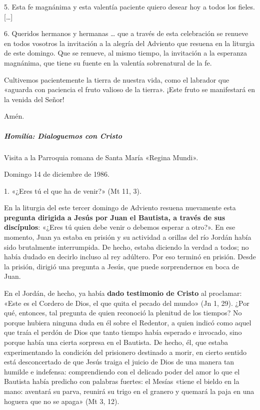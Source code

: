 \documentclass[]{article}
\let\oldsubparagraph\subparagraph
\renewcommand{\subparagraph}[1]{\oldsubparagraph{#1}\mbox{}}
\begin{document}
5. Esta fe magnánima y esta valentía paciente quiero desear hoy a todos
los fieles. {[}\ldots{}{]}

6. Queridos hermanos y hermanas \ldots{} que a través de esta
celebración se renueve en todos vosotros la invitación a la alegría del
Adviento que resuena en la liturgia de este domingo. Que se renueve, al
mismo tiempo, la invitación a la esperanza magnánima, que tiene su
fuente en la valentía sobrenatural de la fe.

Cultivemos pacientemente la tierra de nuestra vida, como el labrador que
«aguarda con paciencia el fruto valioso de la tierra». ¡Este fruto se
manifestará en la venida del Señor!

Amén.

\subparagraph{Homilía: Dialoguemos con
Cristo}\label{homiluxeda-dialoguemos-con-cristo}

Visita a la Parroquia romana de Santa María «Regina Mundi». 

Domingo 14 de diciembre de 1986.

1. «¿Eres tú el que ha de venir?» (Mt 11, 3).

En la liturgia del este tercer domingo de Adviento resuena nuevamente
esta \textbf{pregunta dirigida a Jesús por Juan el Bautista, a través de
sus discípulos}: «¿Eres tú quien debe venir o debemos esperar a otro?».
En ese momento, Juan ya estaba en prisión y su actividad a orillas del
río Jordán había sido brutalmente interrumpida. De hecho, estaba
diciendo la verdad a todos; no había dudado en decirlo incluso al rey
adúltero. Por eso terminó en prisión. Desde la prisión, dirigió una
pregunta a Jesús, que puede sorprendernos en boca de Juan.

En el Jordán, de hecho, ya había \textbf{dado testimonio de Cristo} al
proclamar: «Este es el Cordero de Dios, el que quita el pecado del
mundo» (Jn 1, 29). ¿Por qué, entonces, tal pregunta de quien reconoció
la plenitud de los tiempos? No porque hubiera ninguna duda en él sobre
el Redentor, a quien indicó como aquel que traía el perdón de Dios que
tanto tiempo había esperado e invocado, sino porque había una cierta
sorpresa en el Bautista. De hecho, él, que estaba experimentando la
condición del prisionero destinado a morir, en cierto sentido está
desconcertado de que Jesús traiga el juicio de Dios de una manera tan
humilde e indefensa: comprendiendo con el delicado poder del amor lo que
el Bautista había predicho con palabras fuertes: el Mesías «tiene el
bieldo en la mano: aventará su parva, reunirá su trigo en el granero y
quemará la paja en una hoguera que no se apaga» (Mt 3, 12).
\end{document}
